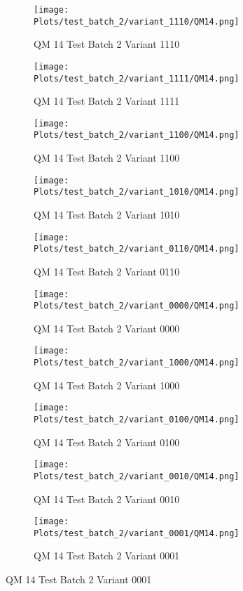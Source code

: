 \documentclass{DissertateFigs}
\begin{document}
\begin{figure}[t!]
    \begin{subfigure}{0.47\textwidth}
    \texttt{[image: Plots/test\_batch\_2/variant\_1110/QM14.png]}
    \caption{QM 14 Test Batch 2 Variant 1110}
    \end{subfigure}
    \begin{subfigure}{0.47\textwidth}
    \texttt{[image: Plots/test\_batch\_2/variant\_1111/QM14.png]}
    \caption{QM 14 Test Batch 2 Variant 1111}
    \end{subfigure}

\medskip

    \begin{subfigure}{0.47\textwidth}
    \texttt{[image: Plots/test\_batch\_2/variant\_1100/QM14.png]}
    \caption{QM 14 Test Batch 2 Variant 1100}
    \end{subfigure}
    \begin{subfigure}{0.47\textwidth}
    \texttt{[image: Plots/test\_batch\_2/variant\_1010/QM14.png]}
    \caption{QM 14 Test Batch 2 Variant 1010}
    \end{subfigure}

\medskip

    \begin{subfigure}{0.47\textwidth}
    \texttt{[image: Plots/test\_batch\_2/variant\_0110/QM14.png]}
    \caption{QM 14 Test Batch 2 Variant 0110}
    \end{subfigure}
    \begin{subfigure}{0.47\textwidth}
    \texttt{[image: Plots/test\_batch\_2/variant\_0000/QM14.png]}
    \caption{QM 14 Test Batch 2 Variant 0000}
    \end{subfigure}

\medskip

    \begin{subfigure}{0.47\textwidth}
    \texttt{[image: Plots/test\_batch\_2/variant\_1000/QM14.png]}
    \caption{QM 14 Test Batch 2 Variant 1000}
    \end{subfigure}
    \begin{subfigure}{0.47\textwidth}
    \texttt{[image: Plots/test\_batch\_2/variant\_0100/QM14.png]}
    \caption{QM 14 Test Batch 2 Variant 0100}
    \end{subfigure}

\medskip

    \begin{subfigure}{0.47\textwidth}
    \texttt{[image: Plots/test\_batch\_2/variant\_0010/QM14.png]}
    \caption{QM 14 Test Batch 2 Variant 0010}
    \end{subfigure}
    \begin{subfigure}{0.47\textwidth}
    \texttt{[image: Plots/test\_batch\_2/variant\_0001/QM14.png]}
    \caption{QM 14 Test Batch 2 Variant 0001}
    \end{subfigure}


\end{figure}
\end{document}
